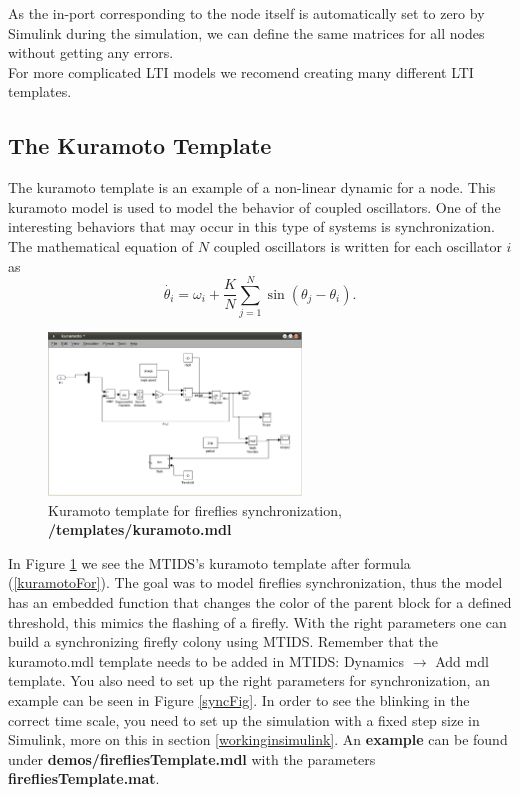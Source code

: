 \documentclass[a4paper,twoside, openright,12pt]{report}
\begin{document}
As the in-port corresponding to the node itself is automatically set to zero by Simulink during the simulation, we can define the same matrices for all 
nodes without getting any errors.
\\

For more complicated LTI models we recomend creating many different LTI templates.

\subsection{The Kuramoto Template}
The kuramoto template is an example of a non-linear dynamic for a node. This kuramoto model is used to model the behavior of coupled oscillators. One of the interesting behaviors
that may occur in this type of systems is synchronization. The mathematical equation of $N$ coupled oscillators is written for each oscillator $i$ as
\begin{equation}\label{kuramotoFor}
 \dot{\theta_i} = \omega_i + \frac{K}{N} \sum_{j=1}^N \sin(\theta_j-\theta_i). 
\end{equation}



\begin{figure}[htb]
\centering
\includegraphics[width=0.6\textwidth]{pics/screenKuramoto.eps}
\caption[MTIDS Kuramoto Template]{Kuramoto template for fireflies synchronization, \textbf{/templates/kuramoto.mdl}}
\label{templateKuramotoFig}
\end{figure}
 
In Figure \ref{templateKuramotoFig} we see  the MTIDS's kuramoto template after formula (\ref{kuramotoFor}). The goal was to model fireflies synchronization, thus
the model has an embedded function that changes the color of the parent block for a defined threshold, this mimics the flashing of a firefly.
With the right parameters one can build a synchronizing firefly colony using MTIDS. Remember that the kuramoto.mdl template needs to be added in MTIDS:
Dynamics $\rightarrow$ Add mdl template. You also need to set up the right parameters for synchronization, an example can be seen in Figure \ref{syncFig}.
In order to see the blinking in the correct time scale, you need to set up the simulation with a fixed step size in Simulink, more on this in section 
\ref{workinginsimulink}. An \textbf{example} can be found under \textbf{demos/firefliesTemplate.mdl} with the parameters \textbf{firefliesTemplate.mat}.
\end{document}
